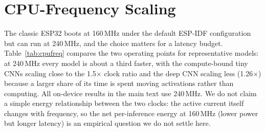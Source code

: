\documentclass[10pt,journal,twocolumn]{IEEEtran}
\begin{document}
\section{CPU-Frequency Scaling}
The classic ESP32 boots at 160\,MHz under the default ESP-IDF configuration but can run at 240\,MHz, and the choice matters for a latency budget. Table~\ref{tab:cpufreq} compares the two operating points for representative models: at 240\,MHz every model is about a third faster, with the compute-bound tiny CNNs scaling close to the 1.5$\times$ clock ratio and the deep CNN scaling less (1.26$\times$) because a larger share of its time is spent moving activations rather than computing. All on-device results in the main text use 240\,MHz. We do not claim a simple energy relationship between the two clocks: the active current itself changes with frequency, so the net per-inference energy at 160\,MHz (lower power but longer latency) is an empirical question we do not settle here.

\begin{table}[t]
\caption{CPU-frequency scaling on the classic ESP32: per-inference latency at 160\,MHz (the ESP-IDF default) and at 240\,MHz (full speed, used for all main-text results).}
\label{tab:cpufreq}
\centering
\footnotesize
\setlength{\tabcolsep}{4pt}
\end{table}
\end{document}
